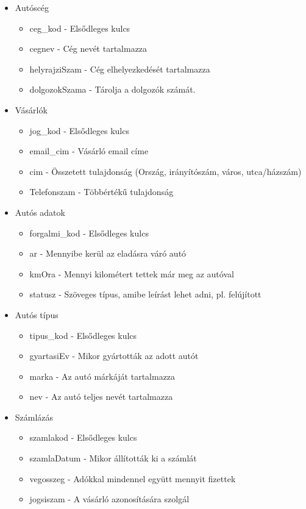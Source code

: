 \documentclass[12pt]{report}
\begin{document}
\begin{itemize}
	\item Autóscég
	\begin{itemize}
		\item ceg\_kod - Elsődleges kulcs
		\item cegnev - Cég nevét tartalmazza
		\item helyrajziSzam - Cég elhelyezkedését tartalmazza
		\item dolgozokSzama - Tárolja a dolgozók számát.
	\end{itemize}
		
	\item Vásárlók
	\begin{itemize}
		\item jog\_kod - Elsődleges kulcs
		\item email\_cim - Vásárló email címe
		\item cim - Összetett tulajdonság (Ország, irányítószám, város, utca/házszám)
		\item Telefonszam - Többértékű tulajdonság
	\end{itemize}

	\item Autós adatok
	\begin{itemize}
		\item forgalmi\_kod - Elsődleges kulcs
		\item ar - Mennyibe kerül az eladásra váró autó
		\item kmOra - Mennyi kilométert tettek már meg az autóval
		\item statusz - Szöveges típus, amibe leírást lehet adni, pl. felújított 
	\end{itemize}

	\item Autós típus
	\begin{itemize}
		\item tipus\_kod - Elsődleges kulcs
		\item gyartasiEv - Mikor gyártották az adott autót
		\item marka - Az autó márkáját tartalmazza
		\item nev - Az autó teljes nevét tartalmazza
	\end{itemize}

	\item Számlázás 
	\begin{itemize}
		\item szamlakod - Elsődleges kulcs
		\item szamlaDatum - Mikor állították ki a számlát
		\item vegosszeg - Adókkal mindennel együtt mennyit fizettek
		\item jogsiszam - A vásárló azonosítására szolgál
	\end{itemize}
\end{itemize}
\end{document}
